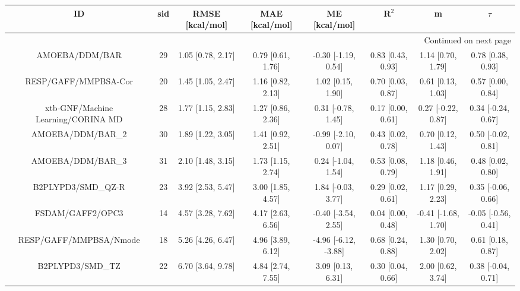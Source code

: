 \documentclass[8pt]{article}
\begin{document}
\begin{center}
\begin{footnotesize}
\begin{longtable}{|cccccccc|}
\toprule
                                 ID &   sid &       RMSE [kcal/mol] &       MAE [kcal/mol] &         ME [kcal/mol] &              R$^2$ &                    m &               $\tau$ \\
\midrule
\endhead
\midrule
\multicolumn{8}{r}{{Continued on next page}} \\
\midrule
\endfoot

\bottomrule
\endlastfoot
                     AMOEBA/DDM/BAR &    29 &     1.05 [0.78, 2.17] &    0.79 [0.61, 1.76] &   -0.30 [-1.19, 0.54] &  0.83 [0.43, 0.93] &    1.14 [0.70, 1.79] &    0.78 [0.38, 0.93] \\
               RESP/GAFF/MMPBSA-Cor &    20 &     1.45 [1.05, 2.47] &    1.16 [0.82, 2.13] &     1.02 [0.15, 1.90] &  0.70 [0.03, 0.87] &    0.61 [0.13, 1.03] &    0.57 [0.00, 0.84] \\
 xtb-GNF/Machine Learning/CORINA MD &    28 &     1.77 [1.15, 2.83] &    1.27 [0.86, 2.36] &    0.31 [-0.78, 1.45] &  0.17 [0.00, 0.61] &   0.27 [-0.22, 0.87] &   0.34 [-0.24, 0.67] \\
                  AMOEBA/DDM/BAR\_2 &    30 &     1.89 [1.22, 3.05] &    1.41 [0.92, 2.51] &   -0.99 [-2.10, 0.07] &  0.43 [0.02, 0.78] &    0.70 [0.12, 1.43] &   0.50 [-0.02, 0.81] \\
                  AMOEBA/DDM/BAR\_3 &    31 &     2.10 [1.48, 3.15] &    1.73 [1.15, 2.74] &    0.24 [-1.04, 1.54] &  0.53 [0.08, 0.79] &    1.18 [0.46, 1.91] &    0.48 [0.02, 0.80] \\
                 B2PLYPD3/SMD\_QZ-R &    23 &     3.92 [2.53, 5.47] &    3.00 [1.85, 4.57] &    1.84 [-0.03, 3.77] &  0.29 [0.02, 0.61] &    1.17 [0.29, 2.23] &   0.35 [-0.06, 0.66] \\
                   FSDAM/GAFF2/OPC3 &    14 &     4.57 [3.28, 7.62] &    4.17 [2.63, 6.56] &   -0.40 [-3.54, 2.55] &  0.04 [0.00, 0.48] &  -0.41 [-1.68, 1.70] &  -0.05 [-0.56, 0.41] \\
             RESP/GAFF/MMPBSA/Nmode &    18 &     5.26 [4.26, 6.47] &    4.96 [3.89, 6.12] &  -4.96 [-6.12, -3.88] &  0.68 [0.24, 0.88] &    1.30 [0.70, 2.02] &    0.61 [0.18, 0.87] \\
                   B2PLYPD3/SMD\_TZ &    22 &     6.70 [3.64, 9.78] &    4.84 [2.74, 7.55] &     3.09 [0.13, 6.31] &  0.30 [0.04, 0.66] &    2.00 [0.62, 3.74] &   0.38 [-0.04, 0.71] \\

\end{longtable}
\end{footnotesize}
\end{center}
\end{document}
